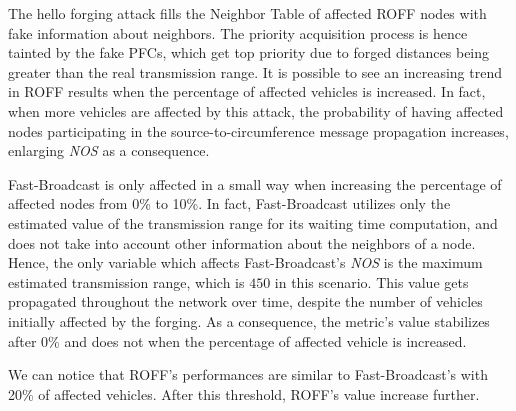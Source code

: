 			The hello forging attack fills the Neighbor Table of affected ROFF nodes with fake information about neighbors. The priority acquisition process is hence tainted by the fake PFCs, which get top priority due to forged distances being greater than the real transmission range. It is possible to see an increasing trend in ROFF results when the percentage of affected vehicles is increased. In fact, when more vehicles are affected by this attack, the probability of having affected nodes participating in the source-to-circumference message propagation increases, enlarging \textit{NOS} as a consequence.
			
			
			Fast-Broadcast is only affected in a small way when increasing the percentage of affected nodes from 0\% to 10\%. In fact, Fast-Broadcast utilizes only the estimated value of the transmission range for its waiting time computation, and does not take into account other information about the neighbors of a node. Hence, the only variable which affects Fast-Broadcast's \textit{NOS} is the maximum estimated transmission range, which is $450$ in this scenario. This value gets propagated throughout the network over time, despite the number of vehicles initially affected by the forging. As a consequence, the metric's value stabilizes after 0\% and does not when the percentage of affected vehicle is increased.
			
			
			We can notice that ROFF's performances are similar to Fast-Broadcast's with 20\% of affected vehicles. After this threshold, ROFF's value increase further.
		
